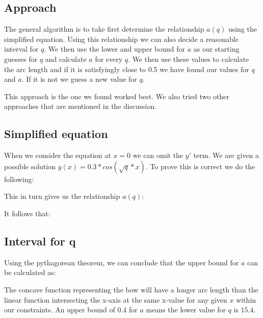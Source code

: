 \subsection{Approach}
The general algorithm is to take first determine the relationship $a(q)$ using the simplified equation. Using this relationship we can also decide a reasonable interval for $q$. We then use the lower and upper bound for $a$ as our starting guesses for $q$ and calculate $a$ for every $q$. We then use these values to calculate the arc length and if it is satisfyingly close to 0.5 we have found our values for $q$ and $a$. If it is not we guess a new value for $q$.

This approach is the one we found worked best. We also tried two other approaches that are mentioned in the discussion.

\subsection{Simplified equation}
When we consider the equation at $x=0$ we can omit the $y'$ term. We are given a possible solution $y(x)=0.3*cos(\sqrt{q}*x)$. To prove this is correct we do the following:

\begin{center}
    
\end{center}

This in turn gives us the relationship $a(q)$:

\begin{center}
    
\end{center}

It follows that:

\begin{center}
    
\end{center}

\subsection{Interval for q}
Using the pythagorean theorem, we can conclude that the upper bound for $a$ can be calculated as:

\begin{center}
    
\end{center}


The concave function representing the bow will have a longer arc length than the linear function intersecting the x-axis at the same x-value for any given $x$ within our constraints. An upper bound of $0.4$ for $a$ means the lower value for $q$ is $15.4$.

